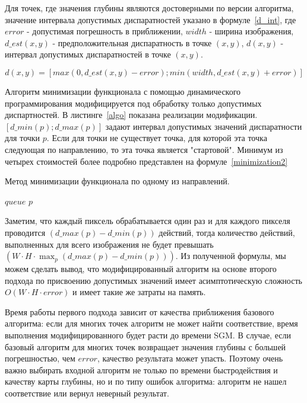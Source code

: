 Для точек, где значения глубины являются достоверными по версии алгоритма, значение интервала допустимых диспаратностей указано в формуле~\ref{d_int}, где $error$ - допустимая погрешность в приближении, $width$ - ширина изображения, $d\_est(x,y)$ -  предположительная диспаратность в точке $(x,y)$, $d(x,y)$ - интервал допустимых диспаратностей в точке $(x,y)$.

\begin{equation}
\label{d_int}
d(x,y) = [ max(0,  d\_est(x,y) - error); min( width, d\_est(x,y) + error)]
\end{equation}

Алгоритм минимизации функционала с помощью динамического программирования модифицируется под обработку только допустимых диспартностей. В листинге~\ref{algo} показана реализации модификации. $[d\_min(p);  d\_max(p)]$ задают интервал допустимых значений диспаратности для точки $p$. Если для точки не существует точка, для которой эта точка следующая по направлению, то эта точка является "стартовой". Минимум из четырех стоимостей более подробно представлен на формуле~\ref{minimization2}

\begin{algorithm}[h!]
\caption{Метод минимизации функционала по одному из направлений.}
\label{algo}
\begin{algorithmic}[1]
  $queue$
     $p$
    \ENDFOR
   \ENDIF
  \ENDWHILE
\end{algorithmic}
\end{algorithm}

Заметим, что каждый пиксель обрабатывается один раз и для каждого пикселя проводится $(d\_max(p) - d\_min(p))$ действий, тогда количество действий, выполненных для всего изображения не будет превышать $(W \cdot H \cdot \max_{p} (d\_max(p) - d\_min(p)))$. Из полученной формулы, мы можем сделать вывод, что модифицированный алгоритм на основе второго подхода по присвоению допустимых значений имеет асимптотическую сложность $O(W \cdot H \cdot error)$ и имеет такие же затраты на память. 

Время работы первого подхода зависит от качества приближения базового алгоритма:  если для многих точек алгоритм не может найти соответствие, время выполнения модифицированного будет расти до времени SGM. В случае, если базовый алгоритм для многих точек возвращает значения глубины с большей погрешностью, чем $error$, качество результата может упасть. Поэтому очень важно выбирать входной алгоритм не только по времени быстродействия и качеству карты глубины, но и по типу ошибок алгоритма: алгоритм не нашел соответствие или вернул неверный результат.


